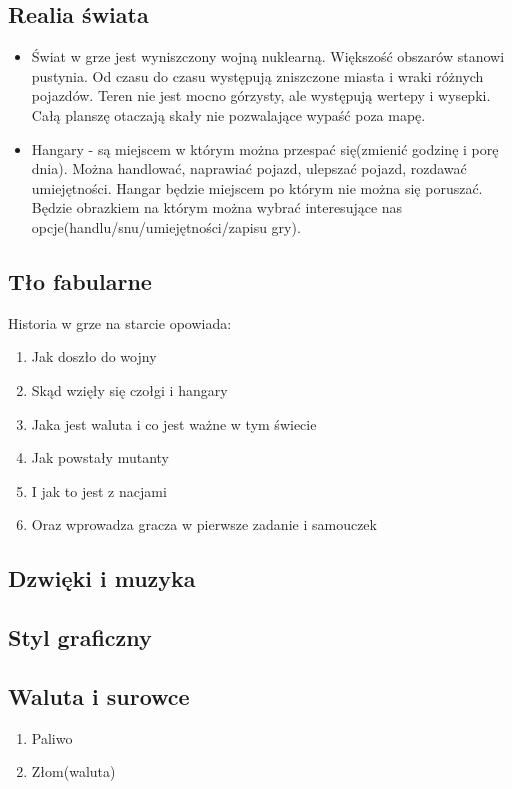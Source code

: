 \documentclass{article}
\begin{document}
    \subsection{Realia świata}
    \begin{itemize}
 

    \item Świat w grze jest wyniszczony wojną nuklearną. Większość obszarów stanowi pustynia. Od czasu do czasu występują zniszczone miasta i wraki różnych pojazdów. Teren nie jest mocno górzysty, ale występują wertepy i wysepki. Całą planszę otaczają skały nie pozwalające wypaść poza mapę. 
\item Hangary - są miejscem w którym można przespać się(zmienić godzinę i porę dnia). Można handlować, naprawiać pojazd, ulepszać pojazd, rozdawać umiejętności. Hangar będzie miejscem po którym nie można się poruszać. Będzie obrazkiem na którym można wybrać interesujące nas opcje(handlu/snu/umiejętności/zapisu gry).
    \end{itemize}
    \subsection{Tło fabularne}
    Historia w grze na starcie opowiada: 
    \begin{enumerate}
        \item Jak doszło do wojny
        \item Skąd wzięły się czołgi i hangary
        \item Jaka jest waluta i co jest ważne w tym świecie
        \item Jak powstały mutanty
        \item I jak to jest z nacjami
        \item Oraz wprowadza gracza w pierwsze zadanie i samouczek
    \end{enumerate}
    \subsection{Dzwięki i muzyka}
    
    
    \subsection{Styl graficzny}
    
    
    \subsection{Waluta i surowce}
    \begin{enumerate}
        \item Paliwo
        \item Złom(waluta)
    \end{enumerate}
    \newpage
    
\end{document}
